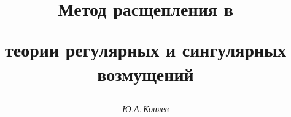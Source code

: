 

 




 


\newcommand{\re}{\operatorname{Re}} 


\newcommand{\diag}{\operatorname{diag}} 


\newcommand{\tts}[1]{} 


 




\setcounter{page}{10} 












 


\author{\it Ю.А.\,Коняев} 




\title{Метод расщепления в 


теории регулярных и сингулярных возмущений} 


 


\date{} 




\pagestyle{plain} %


 




\maketitle 


